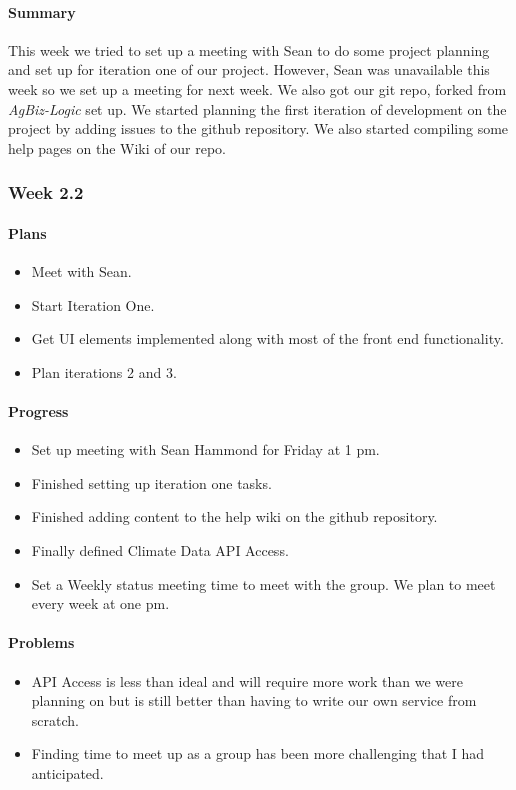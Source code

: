 \documentclass[onecolumn, draftclsnofoot,10pt, compsoc]{article}
\begin{document}
			\paragraph{Summary} \hfill \break
			This week we tried to set up a meeting with Sean to do some project planning and set up for iteration one of our project. However, Sean was unavailable this week so we set up a meeting for next week. We also got our git repo, forked from \textit{AgBiz-Logic} set up. We started planning the first iteration of development on the project by adding issues to the github repository. We also started compiling some help pages on the Wiki of our repo.\\

		\subsubsection{Week 2.2}
			\paragraph{Plans}
				\begin{itemize}
					\item Meet with Sean.
					\item Start Iteration One.
					\item Get UI elements implemented along with most of the front end functionality.
					\item Plan iterations 2 and 3.
				\end{itemize}
			\paragraph{Progress} \hfill \break
				\begin{itemize}
					\item Set up meeting with Sean Hammond for Friday at 1 pm.
					\item Finished setting up iteration one tasks.
					\item Finished adding content to the help wiki on the github repository.
					\item Finally defined Climate Data API Access.
					\item Set a Weekly status meeting time to meet with the group. We plan to meet every week at one pm.
				\end{itemize}
			\paragraph{Problems} \hfill \break
				\begin{itemize}
					\item API Access is less than ideal and will require more work than we were planning on but is still better than having to write our own service from scratch.
					\item Finding time to meet up as a group has been more challenging that I had anticipated.
				\end{itemize}
\end{document}
